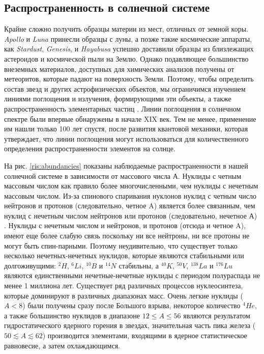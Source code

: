 \documentclass[14pt, a4paper]{article}
\numberwithin{figure}{section}
\numberwithin{equation}{section}
\begin{document}
\subsection{Распространенность в солнечной системе}
Крайне сложно получить образцы материи из мест, отличных от земной коры. \textit{Apollo} и \textit{Luna} принесли образцы с луны, а позже такие космические аппараты, как \textit{Stardust}, \textit{Genesis}, и \textit{Hayabusa} успешно доставили образцы из близлежащих астероидов и космической пыли на Землю. Однако подавляющее большинство внеземных материалов, доступных для химических анализов получены от метеоритов, которые падают на поверхность Земли. Поэтому, чтобы определить состав звезд и других астрофизических	 объектов, мы ограничимся изучением линиями поглощения и излучения, формирующими эти объекты, а также распространенность элементарных частиц \cite{shaviv}. Линии поглощения в солнечном спектре были впервые обнаружены в начале XIX век. Тем не менее, применение им нашли только 100 лет спустя, после развития квантовой механики, которая утверждает, что линии поглощения могут использоваться для количественного определения распространенности элементов на солнце.

На рис. \ref{ris:abundancies} показаны наблюдаемые распространенности в нашей солнечной системе в зависимости от массового числа А. Нуклиды с четным массовым числом как правило более многочисленными, чем нуклиды с нечетным массовым числом. Из-за спинового спаривания нуклонов нуклид с четным число нейтронов и протонов (следовательно, четное A) является более связанным, чем нуклид с нечетным числом нейтронов или протонов (следовательно, нечетное А) \cite{zur}. Нуклиды с нечетным числом и нейтронов, и протонов (отсюда и четное A), имеют еще более слабую связь поскольку ни все нейтроны, ни все протоны не могут быть спин-парными. Поэтому неудивительно, что существует только несколько нечетных-нечетных нуклидов, которые являются стабильными или долгоживущими: $^2H$, $^6Li$, $^{10}B$ и $^{14}N$ стабильны, а $^{40}K$, $^{50}V$, $^{138}La$ и $^{176}Lu$ являются единственными нечетные-нечетные нуклиды с периодом полураспада не менее 1 миллиона лет. Существует ряд различных процессов нуклеосинтеза, которые доминируют в различных диапазонах масс. Очень легкие нуклиды ($A<8$) были получены сразу после Большого взрыва, некоторое количество $^4He$, а также большинство нуклидов в диапазоне $12 \le A \le 56$ являются результатом гидростатического ядерного горения в звездах, значительная часть пика железа ($50 \lesssim A \lesssim 62$) производится элементами, входящими в ядерное статистическое равновесие, а затем охлаждающимся.
\end{document}
